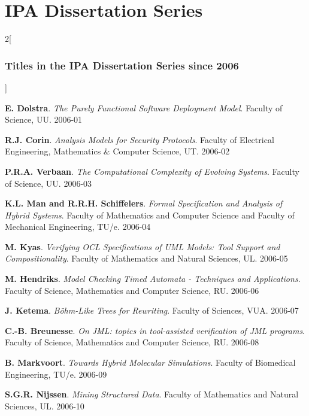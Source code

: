 \newcommand*{\promitem}[4]{\noindent \textbf{#1}. \emph{#2}. #3. \mbox{#4}\medskip}

\chapter{IPA Dissertation Series}
\setlength{\columnsep}{2em}
\begin{multicols}{2}[\subsection*{Titles in the IPA Dissertation Series since 2006}]

\promitem{E. Dolstra}
         {The Purely Functional Software Deployment Model}
         {Faculty of Science, UU}
         {2006-01}

\promitem{R.J. Corin}
         {Analysis Models for Security Protocols}
         {Faculty of Electrical Engineering, Mathematics \& Computer Science, UT}
         {2006-02}

\promitem{P.R.A. Verbaan}
         {The Computational Complexity of Evolving Systems}
         {Faculty of Science, UU}
         {2006-03}

\promitem{K.L. Man and R.R.H. Schiffelers}
         {Formal Specification and Analysis of Hybrid Systems}
         {Faculty of Mathematics and Computer Science and Faculty of Mechanical Engineering, TU/e}
         {2006-04}

\promitem{M. Kyas}
         {Verifying OCL Specifications of UML Models: Tool Support and Compositionality}
         {Faculty of Mathematics and Natural Sciences, UL}
         {2006-05}

\promitem{M. Hendriks}
         {Model Checking Timed Automata - Techniques and Applications}
         {Faculty of Science, Mathematics and Computer Science, RU}
         {2006-06}

\promitem{J. Ketema}
         {B\"ohm-Like Trees for Rewriting}
         {Faculty of Sciences, VUA}
         {2006-07}

\promitem{C.-B. Breunesse}
         {On JML: topics in tool-assisted verification of JML programs}
         {Faculty of Science, Mathematics and Computer Science, RU}
         {2006-08}

\promitem{B. Markvoort}
         {Towards Hybrid Molecular Simulations}
         {Faculty of Biomedical Engineering, TU/e}
         {2006-09}

\promitem{S.G.R. Nijssen}
         {Mining Structured Data}
         {Faculty of Mathematics and Natural Sciences, UL}
         {2006-10}


\end{multicols}
